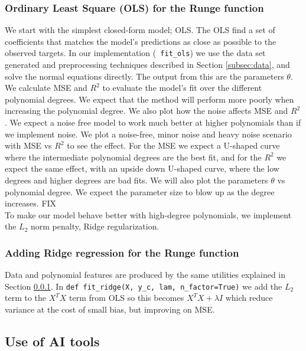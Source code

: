 \documentclass[amssymb,twocolumn,aps]{revtex4}
\begin{document}
\subsubsection{Ordinary Least Square (OLS) for the Runge function}
\label{subsec:ols}

We start with the simplest closed-form model; OLS. The OLS find a set of coefficients that matches the model's predictions as close as possible to the observed targets. In our implementation (\texttt{ fit\_ols}) we use the data set generated and preprocessing techniques described in Section \ref{subsec:data}, and solve the normal equations directly. The output from this are the parameters $\theta$. We calculate MSE and $R^2$ to evaluate the model's fit over the different polynomial degrees. We expect that the method will perform more poorly when increasing the polynomial degree. We also plot how the noise affects MSE and $R^2$. We expect a noise free model to work much better at higher polynomials than if we implement noise. We plot a noise-free, minor noise and heavy noise scenario with MSE vs $R^2$ to see the effect. For the MSE we expect a U-shaped curve where the intermediate polynomial degrees are the best fit, and for the $R^2$ we expect the same effect, with an upside down U-shaped curve, where the low degrees and higher degrees are bad fits. We will also plot the parameters $\theta$ vs polynomial degree. We expect the parameter size to blow up as the degree increases. FIX \\

To make our model behave better with high-degree polynomials, we implement the $L_2$ norm penalty, Ridge regularization. \\

\subsubsection{Adding Ridge regression for the Runge function}

Data and polynomial features are produced by the same utilities explained in Section \ref{subsec:ols}. In \texttt{def fit\_ridge(X, y\_c, lam, n\_factor=True)} we add the $L_2$ term to the $X^TX$ term from OLS so this becomes $X^TX + \lambda I$ which reduce variance at the cost of small bias, but improving on MSE. 

\subsection{Use of AI tools}
	
\end{document}
